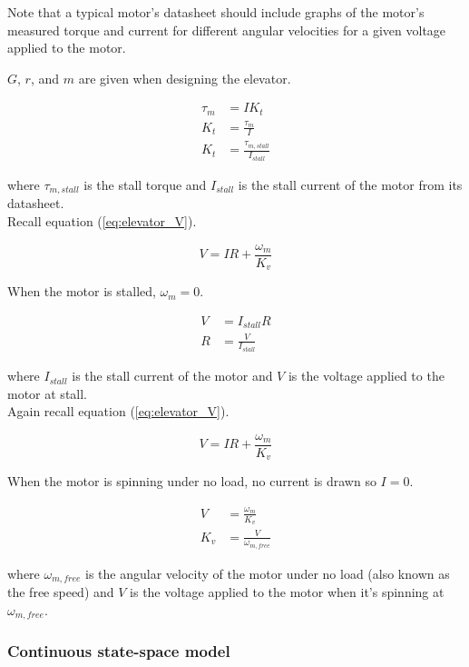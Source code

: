 Note that a typical motor's datasheet should include graphs of the motor's
measured torque and current for different angular velocities for a given voltage
applied to the motor.

$G$, $r$, and $m$ are given when designing the elevator.

\begin{align}
  \tau_m &= I K_t \nonumber \\
  K_t &= \frac{\tau_m}{I} \nonumber \\
  K_t &= \frac{\tau_{m,stall}}{I_{stall}}
\end{align}

where $\tau_{m,stall}$ is the stall torque and $I_{stall}$ is the stall current
of the motor from its datasheet. \\

Recall equation (\ref{eq:elevator_V}).

\begin{equation*}
  V = IR + \frac{\omega_m}{K_v}
\end{equation*}

When the motor is stalled, $\omega_m = 0$.

\begin{align}
  V &= I_{stall} R \nonumber \\
  R &= \frac{V}{I_{stall}}
\end{align}

where $I_{stall}$ is the stall current of the motor and $V$ is the voltage
applied to the motor at stall. \\

Again recall equation (\ref{eq:elevator_V}).

\begin{equation*}
  V = IR + \frac{\omega_m}{K_v}
\end{equation*}

When the motor is spinning under no load, no current is drawn so $I = 0$.

\begin{align}
  V &= \frac{\omega_m}{K_v} \nonumber \\
  K_v &= \frac{V}{\omega_{m,free}}
\end{align}

where $\omega_{m,free}$ is the angular velocity of the motor under no load (also
known as the free speed) and $V$ is the voltage applied to the motor when
it's spinning at $\omega_{m,free}$.

\subsubsection{Continuous state-space model}

